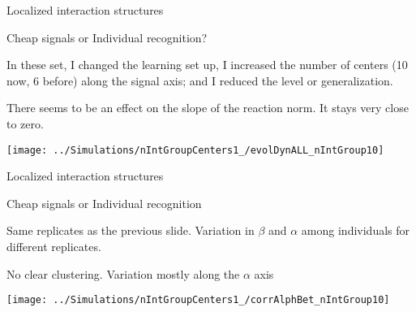 \documentclass[
  ignorenonframetext,
]{beamer}
\begin{document}
\begin{frame}{Localized interaction structures}
\protect\hypertarget{localized-interaction-structures-3}{}

\begin{block}{Cheap signals or Individual recognition?}

\tiny

In these set, I changed the learning set up, I increased the number of
centers (10 now, 6 before) along the signal axis; and I reduced the
level or generalization.

There seems to be an effect on the slope of the reaction norm. It stays
very close to zero.

\begin{center}\texttt{[image: ../Simulations/nIntGroupCenters1\_/evolDynALL\_nIntGroup10]} \end{center}

\end{block}

\end{frame}

\begin{frame}{Localized interaction structures}
\protect\hypertarget{localized-interaction-structures-4}{}

\begin{block}{Cheap signals or Individual recognition}

\small

Same replicates as the previous slide. Variation in \(\beta\) and
\(\alpha\) among individuals for different replicates.

No clear clustering. Variation mostly along the \(\alpha\) axis

\begin{center}\texttt{[image: ../Simulations/nIntGroupCenters1\_/corrAlphBet\_nIntGroup10]} \end{center}

\end{block}

\end{frame}
\end{document}
